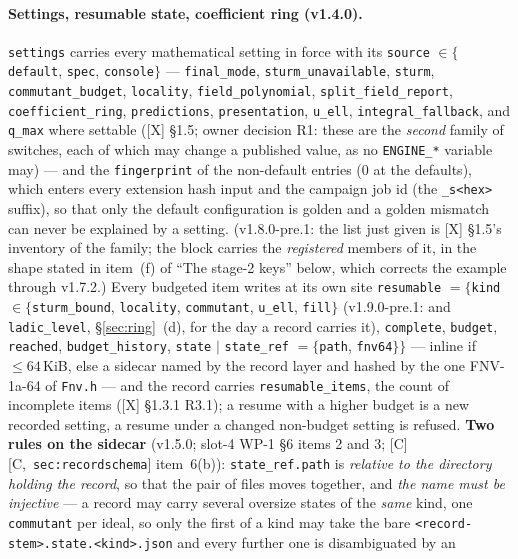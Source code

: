 \documentclass[11pt]{article}
\theoremstyle{remark}
\newcommand{\HA}[1]{[C,~\texttt{#1}]}      %
\begin{document}
\paragraph{Settings, resumable state, coefficient ring (v1.4.0).} \texttt{settings} carries
every mathematical setting in force with its \texttt{source} $\in\{$\texttt{default},
\texttt{spec}, \texttt{console}$\}$ --- \texttt{final\_mode}, \texttt{sturm\_unavailable},
\texttt{sturm}, \texttt{commutant\_budget}, \texttt{locality}, \texttt{field\_polynomial},
\texttt{split\_field\_report},
\texttt{coefficient\_ring}, \texttt{predictions}, \texttt{presentation}, \texttt{u\_ell},
\texttt{integral\_fallback}, and \texttt{q\_max} where settable ([X] \S1.5; owner decision R1:
these are the \emph{second} family of switches, each of which may change a published value,
as no \texttt{ENGINE\_*} variable may) --- and the \texttt{fingerprint} of the non-default
entries ($0$ at the defaults), which enters every extension hash input and the campaign job id
(the \texttt{\_s<hex>} suffix), so that only the default configuration is golden and a golden
mismatch can never be explained by a setting. (v1.8.0-pre.1: the list just given is [X]
\S1.5's inventory of the family; the block carries the \emph{registered} members of it, in the
shape stated in item~(f) of ``The stage-2 keys'' below, which corrects the example through
v1.7.2.) Every budgeted item writes at its own site
\texttt{resumable} $=\{$\texttt{kind} $\in\{$\texttt{sturm\_bound}, \texttt{locality},
\texttt{commutant}, \texttt{u\_ell}, \texttt{fill}$\}$ (v1.9.0-pre.1: and
\texttt{ladic\_level}, \S\ref{sec:ring}~(d), for the day a record carries it), \texttt{complete}, \texttt{budget},
\texttt{reached}, \texttt{budget\_history}, \texttt{state} $\mid$ \texttt{state\_ref}
$=\{$\texttt{path}, \texttt{fnv64}$\}\}$ --- inline if $\le64$\,KiB, else a sidecar named by
the record layer and hashed by the one FNV-1a-64 of \texttt{Fnv.h} --- and the record carries
\texttt{resumable\_items}, the count of incomplete items ([X] \S1.3.1 R3.1); a resume with a
higher budget is a new recorded setting, a resume under a changed non-budget setting is refused.
\textbf{Two rules on the sidecar} (v1.5.0; slot-4 WP-1 \S6 items 2 and 3; [C]
\HA{sec:recordschema} item~6(b)): \texttt{state\_ref.path} is \emph{relative to the
directory holding the record}, so that the pair of files moves together, and \emph{the
name must be injective} --- a record may carry several oversize states of the \emph{same}
kind, one \texttt{commutant} per ideal, so only the first of a kind may take the bare
\texttt{<record-stem>.state.<kind>.json} and every further one is disambiguated by an
\end{document}
